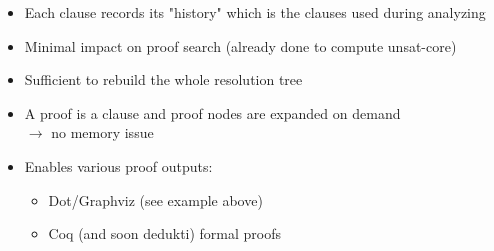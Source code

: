 \documentclass[portrait,a0,final]{a0poster}
\begin{document}
\begin{center}
\begin{multicols}{2}
{
  \inputminted{ocaml}{theory_intf.ml}
}

{
  \begin{itemize}[label=\checkmark]
    \item Each clause records its "history" which is the clauses
      used during analyzing
    \item Minimal impact on proof search (already done to compute
      unsat-core)
    \item Sufficient to rebuild the whole resolution tree
    \item A proof is a clause and proof nodes are expanded on demand\\
      $\rightarrow$ no memory issue
    \item Enables various proof outputs:
      \begin{itemize}[label=$\bullet$]
        \item Dot/Graphviz (see example above)
        \item Coq (and soon dedukti) formal proofs
      \end{itemize}
  \end{itemize}
}


\end{multicols}
\end{center}
\end{document}
